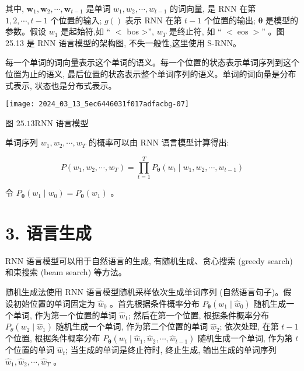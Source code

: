 \documentclass[10pt]{article}
\begin{document}
其中, $\boldsymbol{w}_{1}, \boldsymbol{w}_{2}, \cdots, \boldsymbol{w}_{t-1}$ 是单词 $w_{1}, w_{2}, \cdots, w_{t-1}$ 的词向量, 是 RNN 在第 $1,2, \cdots, t-1$ 个位置的输入; $g()$ 表示 RNN 在第 $t-1$ 个位置的输出; $\boldsymbol{\theta}$ 是模型的参数。假设 $w_{1}$ 是起始符,如 “ $<$ bos >”, $w_{T}$ 是终止符, 如 “ $<\operatorname{eos}>”$ 。图 25.13 是 RNN 语言模型的架构图, 不失一般性,这里使用 S-RNN。

每一个单词的词向量表示这个单词的语义。每一个位置的状态表示单词序列到这个位置为止的语义, 最后位置的状态表示整个单词序列的语义。单词的词向量是分布式表示, 状态也是分布式表示。

\begin{center}
\texttt{[image: 2024\_03\_13\_5ec6446031f017adfacbg-07]}
\end{center}

图 $25.13 \mathrm{RNN}$ 语言模型

单词序列 $w_{1}, w_{2}, \cdots, w_{T}$ 的概率可以由 $\mathrm{RNN}$ 语言模型计算得出:


\begin{equation*}
P\left(w_{1}, w_{2}, \cdots, w_{T}\right)=\prod_{t=1}^{T} P_{\boldsymbol{\theta}}\left(w_{t} \mid w_{1}, w_{2}, \cdots, w_{t-1}\right) \tag{25.51}
\end{equation*}


令 $P_{\boldsymbol{\theta}}\left(w_{1} \mid w_{0}\right)=P_{\boldsymbol{\theta}}\left(w_{1}\right)$ 。

\section*{3. 语言生成}
RNN 语言模型可以用于自然语言的生成, 有随机生成、贪心搜索 (greedy search) 和束搜索 (beam search) 等方法。

随机生成法使用 RNN 语言模型随机采样依次生成单词序列 (自然语言句子)。假设初始位置的单词固定为 $\hat{w}_{0}$ 。首先根据条件概率分布 $P_{\boldsymbol{\theta}}\left(w_{1} \mid \hat{w}_{0}\right)$ 随机生成一个单词, 作为第一个位置的单词 $\hat{w}_{1}$; 然后在第一个位置, 根据条件概率分布 $P_{\theta}\left(w_{2} \mid \hat{w}_{1}\right)$ 随机生成一个单词, 作为第二个位置的单词 $\hat{w}_{2}$; 依次处理, 在第 $t-1$ 个位置, 根据条件概率分布 $P_{\boldsymbol{\theta}}\left(w_{t} \mid \hat{w}_{1}, \hat{w}_{2}, \cdots, \hat{w}_{t-1}\right)$ 随机生成一个单词, 作为第 $t$ 个位置的单词 $\hat{w}_{t}$; 当生成的单词是终止符时, 终止生成, 输出生成的单词序列 $\hat{w}_{1}, \hat{w}_{2}, \cdots, \hat{w}_{T}$ 。
\end{document}
